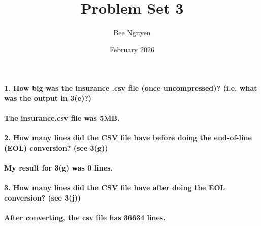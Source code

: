 \documentclass{article}
\title{Problem Set 3}
\author{Bee Nguyen}
\date{February 2026}
\begin{document}
\maketitle

\paragraph{1. How big was the insurance .csv file (once uncompressed)? (i.e. what was the output in 3(e)?)} 

\paragraph{The insurance.csv file was 5MB.}

\paragraph{2. How many lines did the CSV file have before doing the end-of-line (EOL) conversion? (see 3(g))}

\paragraph{My result for 3(g) was 0 lines.}

\paragraph{3. How many lines did the CSV file have after doing the EOL conversion? (see 3(j))}

\paragraph{After converting, the csv file has 36634 lines.}
\end{document}
